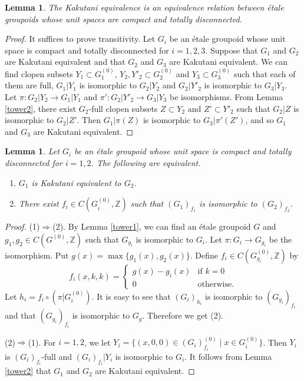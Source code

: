 \documentclass[11pt]{article}
\newtheorem{lem}[thm]{Lemma}
\theoremstyle{definition}
\newcommand{\Z}{\mathbb{Z}}
\begin{document}
\begin{lem}\label{Kakutaniequiv}
The Kakutani equivalence is an equivalence relation 
between \'etale groupoids 
whose unit spaces are compact and totally disconnected. 
\end{lem}
\begin{proof}
It suffices to prove transitivity. 
Let $G_i$ be an \'etale groupoid 
whose unit space is compact and totally disconnected for $i=1,2,3$. 
Suppose that $G_1$ and $G_2$ are Kakutani equivalent and that 
$G_2$ and $G_3$ are Kakutani equivalent. 
We can find clopen subsets $Y_1\subset G_1^{(0)}$, 
$Y_2,Y'_2\subset G_2^{(0)}$ and $Y_3\subset G_3^{(0)}$ such that 
each of them are full, 
$G_1|Y_1$ is isomorphic to $G_2|Y_2$ and 
$G_2|Y'_2$ is isomorphic to $G_3|Y_3$. 
Let $\pi:G_2|Y_2\to G_1|Y_1$ and $\pi':G_2|Y'_2\to G_3|Y_3$ be isomorphisms. 
From Lemma \ref{tower2}, 
there exist $G_2$-full clopen subsets $Z\subset Y_2$ and $Z'\subset Y'_2$ 
such that $G_2|Z$ is isomorphic to $G_2|Z'$. 
Then $G_1|\pi(Z)$ is isomorphic to $G_3|\pi'(Z')$, and so 
$G_1$ and $G_3$ are Kakutani equivalent. 
\end{proof}

\begin{lem}\label{Kakutani=tower}
Let $G_i$ be an \'etale groupoid 
whose unit space is compact and totally disconnected for $i=1,2$. 
The following are equivalent. 
\begin{enumerate}
\item $G_1$ is Kakutani equivalent to $G_2$. 
\item There exist $f_i\in C(G_i^{(0)},\Z)$ such that 
$(G_1)_{f_1}$ is isomorphic to $(G_2)_{f_2}$. 
\end{enumerate}
\end{lem}
\begin{proof}
(1)$\Rightarrow$(2). 
By Lemma \ref{tower1}, 
we can find an \'etale groupoid $G$ and $g_1,g_2\in C(G^{(0)},\Z)$
such that $G_{g_i}$ is isomorphic to $G_i$. 
Let $\pi:G_i\to G_{g_i}$ be the isomorphism. 
Put $g(x)=\max\{g_1(x),g_2(x)\}$. 
Define $f_i\in C(G_{g_i}^{(0)},\Z)$ by 
\[
f_i(x,k,k)=\begin{cases}
g(x)-g_i(x) & \text{if }k=0 \\
0 & \text{otherwise}. \end{cases}
\]
Let $h_i=f_i\circ(\pi|G_i^{(0)})$. 
It is easy to see that 
$(G_i)_{h_i}$ is isomorphic to $(G_{g_i})_{f_i}$ and 
that $(G_{g_i})_{f_i}$ is isomorphic to $G_g$. 
Therefore we get (2). 

(2)$\Rightarrow$(1). 
For $i=1,2$, 
we let $Y_i=\{(x,0,0)\in(G_i)_{f_i}^{(0)}\mid x\in G_i^{(0)}\}$. 
Then $Y_i$ is $(G_i)_{f_i}$-full and 
$(G_i)_{f_i}|Y_i$ is isomorphic to $G_i$. 
It follows from Lemma \ref{tower2} that 
$G_1$ and $G_2$ are Kakutani equivalent. 
\end{proof}
\end{document}
